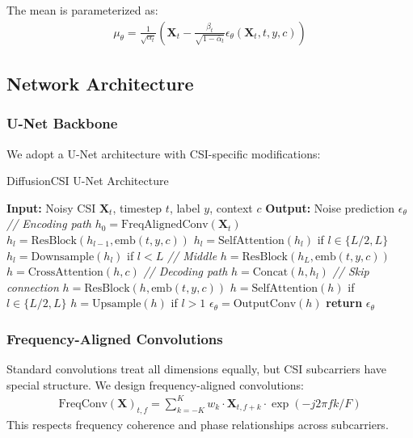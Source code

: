 \documentclass[journal]{IEEEtran}
\begin{document}
The mean is parameterized as:
\begin{align}
\mu_\theta = \frac{1}{\sqrt{\alpha_t}}\left(\mathbf{X}_t - \frac{\beta_t}{\sqrt{1-\bar{\alpha}_t}}\epsilon_\theta(\mathbf{X}_t, t, y, c)\right)
\end{align}

\subsection{Network Architecture}

\subsubsection{U-Net Backbone}
We adopt a U-Net architecture with CSI-specific modifications:

\begin{algorithm}
\caption{DiffusionCSI U-Net Architecture}
\label{alg:unet}
\begin{algorithmic}[1]
\STATE \textbf{Input:} Noisy CSI $\mathbf{X}_t$, timestep $t$, label $y$, context $c$
\STATE \textbf{Output:} Noise prediction $\epsilon_\theta$
\STATE
\STATE \textit{// Encoding path}
\STATE $h_0 = \text{FreqAlignedConv}(\mathbf{X}_t)$
    \STATE $h_l = \text{ResBlock}(h_{l-1}, \text{emb}(t, y, c))$
    \STATE $h_l = \text{SelfAttention}(h_l)$ if $l \in \{L/2, L\}$
    \STATE $h_l = \text{Downsample}(h_l)$ if $l < L$
\ENDFOR
\STATE
\STATE \textit{// Middle}
\STATE $h = \text{ResBlock}(h_L, \text{emb}(t, y, c))$
\STATE $h = \text{CrossAttention}(h, c)$
\STATE
\STATE \textit{// Decoding path}
    \STATE $h = \text{Concat}(h, h_l)$ \textit{// Skip connection}
    \STATE $h = \text{ResBlock}(h, \text{emb}(t, y, c))$
    \STATE $h = \text{SelfAttention}(h)$ if $l \in \{L/2, L\}$
    \STATE $h = \text{Upsample}(h)$ if $l > 1$
\ENDFOR
\STATE
\STATE $\epsilon_\theta = \text{OutputConv}(h)$
\STATE \textbf{return} $\epsilon_\theta$
\end{algorithmic}
\end{algorithm}

\subsubsection{Frequency-Aligned Convolutions}
Standard convolutions treat all dimensions equally, but CSI subcarriers have special structure. We design frequency-aligned convolutions:
\begin{align}
\text{FreqConv}(\mathbf{X})_{t,f} = \sum_{k=-K}^{K} w_k \cdot \mathbf{X}_{t,f+k} \cdot \exp(-j2\pi fk/F)
\end{align}
This respects frequency coherence and phase relationships across subcarriers.
\end{document}
